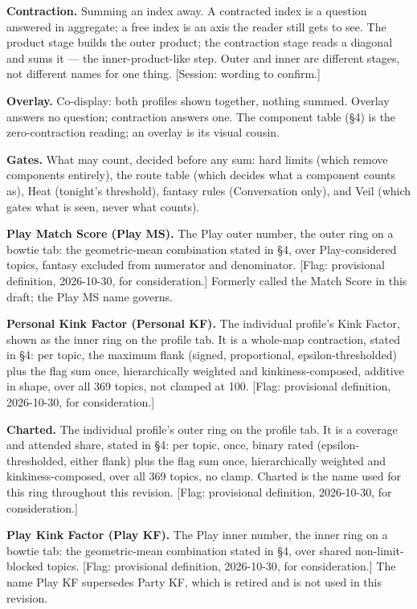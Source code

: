 \textbf{Contraction.} Summing an index away. A contracted index is a
question answered in aggregate; a free index is an axis the reader still
gets to see. The product stage builds the outer product; the contraction
stage reads a diagonal and sums it --- the inner-product-like step.
Outer and inner are different stages, not different names for one thing.
{[}Session: wording to confirm.{]}

\textbf{Overlay.} Co-display: both profiles shown together, nothing
summed. Overlay answers no question; contraction answers one. The
component table (\S 4) is the zero-contraction reading; an overlay is its
visual cousin.

\textbf{Gates.} What may count, decided before any sum: hard limits
(which remove components entirely), the route table (which decides what
a component counts as), Heat (tonight's threshold), fantasy rules
(Conversation only), and Veil (which gates what is seen, never what
counts).

\textbf{Play Match Score (Play MS).} The Play outer number, the outer
ring on a bowtie tab: the geometric-mean combination stated in \S 4, over
Play-considered topics, fantasy excluded from numerator and denominator.
{[}Flag: provisional definition, 2026-10-30, for consideration.{]}
Formerly called the Match Score in this draft; the Play MS name governs.

\textbf{Personal Kink Factor (Personal KF).} The individual profile's
Kink Factor, shown as the inner ring on the profile tab. It is a
whole-map contraction, stated in \S 4: per topic, the maximum flank
(signed, proportional, epsilon-thresholded) plus the flag sum once,
hierarchically weighted and kinkiness-composed, additive in shape, over
all 369 topics, not clamped at 100. {[}Flag: provisional definition,
2026-10-30, for consideration.{]}

\textbf{Charted.} The individual profile's outer ring on the profile
tab. It is a coverage and attended share, stated in \S 4: per topic, once,
binary rated (epsilon-thresholded, either flank) plus the flag sum once,
hierarchically weighted and kinkiness-composed, over all 369 topics, no
clamp. Charted is the name used for this ring throughout this revision.
{[}Flag: provisional definition, 2026-10-30, for consideration.{]}

\textbf{Play Kink Factor (Play KF).} The Play inner number, the inner
ring on a bowtie tab: the geometric-mean combination stated in \S 4, over
shared non-limit-blocked topics. {[}Flag: provisional definition,
2026-10-30, for consideration.{]} The name Play KF supersedes Party KF,
which is retired and is not used in this revision.

